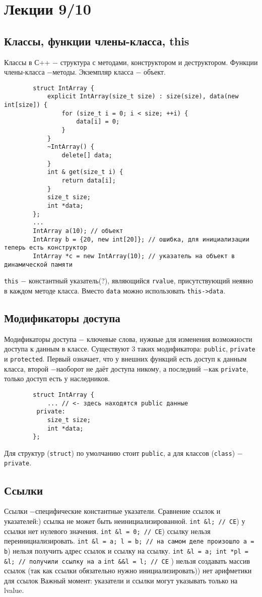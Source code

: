 \documentclass[15pt, a4paper]{article}
\newcommand{\nl}{\newline}
\begin{document}
    \section{Лекции 9/10}
\subsection{Классы, функции члены-класса, this}
    Классы в С++ $-$ структура с методами, конструктором и деструктором.\nl
    Функции члены-класса $-$методы.\nl
    Экземпляр класса $-$ объект.\nl
    \begin{verbatim}
        struct IntArray {
            explicit IntArray(size_t size) : size(size), data(new int[size]) {
                for (size_t i = 0; i < size; ++i) {
                    data[i] = 0;
                }
            }
            ~IntArray() {
                delete[] data;
            }
            int & get(size_t i) {
                return data[i];
            }
            size_t size;
            int *data;
        };
        ...
        IntArray a(10); // объект
        IntArray b = {20, new int[20]}; // ошибка, для инициализации теперь есть конструктор
        IntArray *c = new IntArray(10); // указатель на объект в динамической памяти
    \end{verbatim}
    \texttt{this} $-$ константный указатель(?), являющийся \texttt{rvalue}, присутствующий неявно в каждом
    методе класса. Вместо \texttt{data} можно использовать \texttt{this->data}.
  \subsection{Модификаторы доступа}
    Модификаторы доступа $-$ ключевые слова, нужные для изменения возможности доступа к данным в классе.
    \nl
    Существуют 3 таких модификатора: \texttt{public}, \texttt{private} и \texttt{protected}. Первый означает, что у
    внешних функций есть доступ к данным класса, второй $-$наоборот не даёт доступа никому, а последний $-$как
    \texttt{private}, только доступ есть у наследников.\nl
    \begin{verbatim}
        struct IntArray {
            ... // <- здесь находятся public данные
         private:
            size_t size;
            int *data;
        };
    \end{verbatim}
    Для структур (\texttt{struct}) по умолчанию стоит \texttt{public}, а для классов (\texttt{class}) $-$\texttt{private}.
  \subsection{Ссылки}
  Ссылки $-$специфические константные указатели.\nl
  Сравнение ссылок и указателей:\nl
  1) ссылка не может быть неинициализированной. \nl \texttt{int \&l; // CE}\nl
  2) у ссылки нет нулевого значения. \nl \texttt{int \&l = 0; // CE}\nl
  3) ссылку нельзя переинициализировать. \nl \texttt{int \&l = a; l = b; // на самом деле произошло a = b}\nl
  4) нельзя получить адрес ссылок и ссылку на ссылку. \nl \texttt {int \&l = a; int *pl = \&l; // получили ссылку на a} 
  \nl \texttt{int \&\&l = l; // CE} \nl
  5) нельзя создавать массив ссылок (так как ссылки обязательно нужно инициализировать)\nl
  6) нет арифметики для ссылок\nl
  Важный момент: указатели и ссылки могут указывать только на lvalue.
\end{document}
